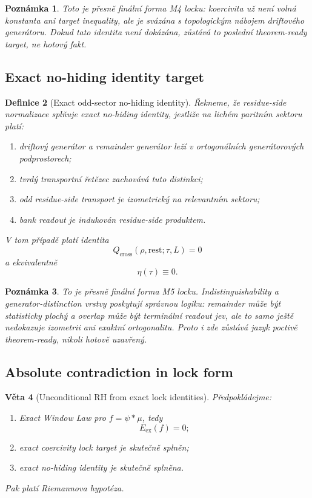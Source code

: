 \documentclass[11pt,a4paper]{article}
\newtheorem{theorem}{Věta}[section]
\newtheorem{definition}[theorem]{Definice}
\newtheorem{remark}[theorem]{Poznámka}
\begin{document}
\begin{remark}
Toto je přesně finální forma M4 locku:
koercivita už není volná konstanta ani target inequality,
ale je svázána s topologickým nábojem driftového generátoru.
Dokud tato identita není dokázána, zůstává to poslední theorem-ready target, ne hotový fakt.
\end{remark}

\subsection*{Exact no-hiding identity target}

\begin{definition}[Exact odd-sector no-hiding identity]
Řekneme, že residue-side normalizace splňuje \emph{exact no-hiding identity}, jestliže
na lichém paritním sektoru platí:
\begin{enumerate}[label=\textbf{(\arabic*)}]
    \item driftový generátor a remainder generátor leží v ortogonálních generátorových podprostorech;
    \item tvrdý transportní řetězec zachovává tuto distinkci;
    \item odd residue-side transport je izometrický na relevantním sektoru;
    \item bank readout je indukován residue-side produktem.
\end{enumerate}
V tom případě platí identita
\[
Q_{\mathrm{cross}}(\rho,\mathrm{rest};\tau,L)=0
\]
a ekvivalentně
\[
\eta(\tau)\equiv 0.
\]
\end{definition}

\begin{remark}
To je přesně finální forma M5 locku.
Indistinguishability a generator-distinction vrstvy poskytují správnou logiku:
remainder může být statisticky plochý a overlap může být terminální readout jev,
ale to samo ještě nedokazuje izometrii ani exaktní ortogonalitu.
Proto i zde zůstává jazyk poctivě theorem-ready, nikoli hotově uzavřený.
\end{remark}

\subsection*{Absolute contradiction in lock form}

\begin{theorem}[Unconditional RH from exact lock identities]
Předpokládejme:
\begin{enumerate}[label=\textbf{(\arabic*)}]
    \item Exact Window Law pro \(f=\psi * \mu\), tedy
    \[
    E_{\mathrm{ex}}(f)=0;
    \]
    \item exact coercivity lock target je skutečně splněn;
    \item exact no-hiding identity je skutečně splněna.
\end{enumerate}
Pak platí Riemannova hypotéza.
\end{theorem}
\end{document}
